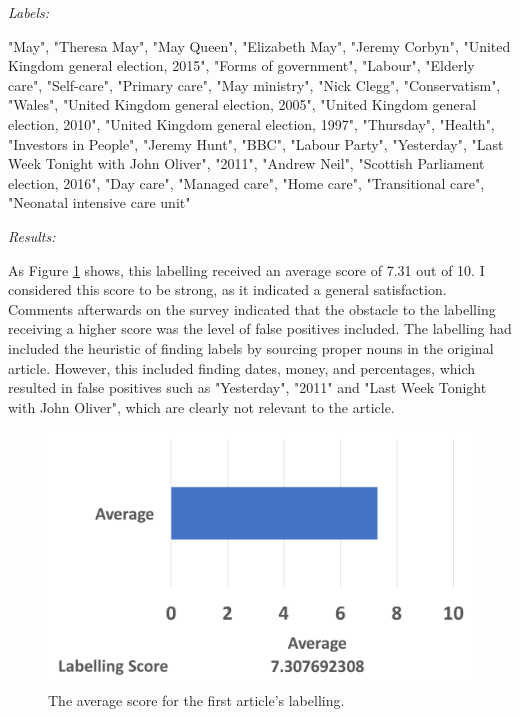 \documentclass[12pt]{article}
\begin{document}
\begin{mdframed}

\emph{Labels:}

"May", "Theresa May", "May Queen", "Elizabeth May", "Jeremy Corbyn", "United Kingdom general election, 2015", "Forms of government", "Labour", "Elderly care", "Self-care", "Primary care", "May ministry", "Nick Clegg", "Conservatism", "Wales", "United Kingdom general election, 2005", "United Kingdom general election, 2010", "United Kingdom general election, 1997", "Thursday", "Health", "Investors in People", "Jeremy Hunt", "BBC", "Labour Party", "Yesterday", "Last Week Tonight with John Oliver", "2011", "Andrew Neil", "Scottish Parliament election, 2016", "Day care", "Managed care", "Home care", "Transitional care", "Neonatal intensive care unit" \\

\end{mdframed}

\emph{Results:}

As Figure \ref{label1} shows, this labelling received an average score of 7.31 out of 10. I considered this score to be strong, as it indicated a general satisfaction. Comments afterwards on the survey indicated that the obstacle to the labelling receiving a higher score was the level of false positives included. The labelling had included the heuristic of finding labels by sourcing proper nouns in the original article. However, this included finding dates, money, and percentages, which resulted in false positives such as "Yesterday", "2011" and "Last Week Tonight with John Oliver", which are clearly not relevant to the article.

\begin{figure}[ht!]
  \centering
    \includegraphics[scale=0.6]{label1score.png}
   \caption[The average score for a labelling]{The average score for the first article's labelling.}
   \label{label1}
\end{figure} 
\end{document}
